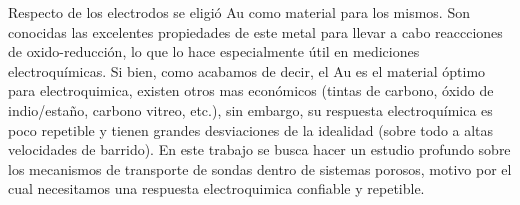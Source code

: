 	Respecto de los electrodos se eligió Au como material para los mismos. Son conocidas las excelentes propiedades de este metal  para llevar a cabo reaccciones de oxido-reducción, lo que lo hace especialmente útil en mediciones electroquímicas.\cite{Wi2000,Pumera2007,Gewirth2004,Villullas2000} Si bien, como acabamos de decir, el Au es el material óptimo para electroquimica, existen otros mas económicos (tintas de carbono, óxido de indio/estaño, carbono vitreo, etc.), sin embargo, su respuesta electroquímica es poco repetible y tienen grandes desviaciones de la idealidad (sobre todo a altas velocidades de barrido). En este trabajo se busca hacer un estudio profundo sobre los mecanismos de transporte de sondas dentro de sistemas porosos, motivo por el cual necesitamos una respuesta electroquimica confiable y repetible.



